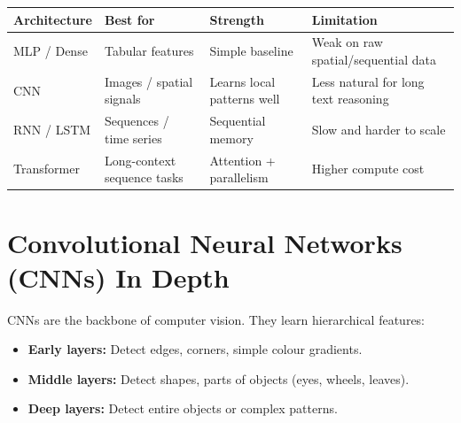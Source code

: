 \documentclass[12pt, a4paper, oneside]{book}
\begin{document}
\begin{center}
\begin{tabular}{l l l l}
\toprule
\textbf{Architecture} & \textbf{Best for} & \textbf{Strength} & \textbf{Limitation} \\
\midrule
MLP / Dense & Tabular features & Simple baseline & Weak on raw spatial/sequential data \\
CNN & Images / spatial signals & Learns local patterns well & Less natural for long text reasoning \\
RNN / LSTM & Sequences / time series & Sequential memory & Slow and harder to scale \\
Transformer & Long-context sequence tasks & Attention + parallelism & Higher compute cost \\
\bottomrule
\end{tabular}
\end{center}

\section{Convolutional Neural Networks (CNNs) In Depth}

CNNs are the backbone of computer vision. They learn hierarchical features:
\begin{itemize}[leftmargin=2em]
    \item \textbf{Early layers:} Detect edges, corners, simple colour gradients.
    \item \textbf{Middle layers:} Detect shapes, parts of objects (eyes, wheels, leaves).
    \item \textbf{Deep layers:} Detect entire objects or complex patterns.
\end{itemize}
\end{document}
